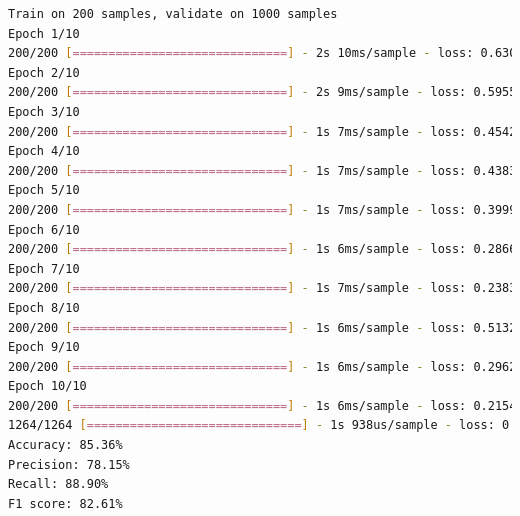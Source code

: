 \begin{lstlisting}[language=bash]
Train on 200 samples, validate on 1000 samples
Epoch 1/10
200/200 [==============================] - 2s 10ms/sample - loss: 0.6307 - acc: 0.6350 - f1_m: 0.3386 - precision_m: 0.9722 - recall_m: 0.2519 - val_loss: 0.6393 - val_acc: 0.6090 - val_f1_m: 0.6948 - val_precision_m: 0.5351 - val_recall_m: 0.9980
Epoch 2/10
200/200 [==============================] - 2s 9ms/sample - loss: 0.5955 - acc: 0.6250 - f1_m: 0.4697 - precision_m: 0.7757 - recall_m: 0.5645 - val_loss: 0.4988 - val_acc: 0.8390 - val_f1_m: 0.8320 - val_precision_m: 0.7773 - val_recall_m: 0.8969
Epoch 3/10
200/200 [==============================] - 1s 7ms/sample - loss: 0.4542 - acc: 0.8700 - f1_m: 0.8178 - precision_m: 0.8778 - recall_m: 0.7895 - val_loss: 0.4353 - val_acc: 0.8150 - val_f1_m: 0.8213 - val_precision_m: 0.7220 - val_recall_m: 0.9551
Epoch 4/10
200/200 [==============================] - 1s 7ms/sample - loss: 0.4383 - acc: 0.8000 - f1_m: 0.7469 - precision_m: 0.8571 - recall_m: 0.7411 - val_loss: 0.4922 - val_acc: 0.7600 - val_f1_m: 0.7883 - val_precision_m: 0.6582 - val_recall_m: 0.9867
Epoch 5/10
200/200 [==============================] - 1s 7ms/sample - loss: 0.3999 - acc: 0.8250 - f1_m: 0.8295 - precision_m: 0.8415 - recall_m: 0.8676 - val_loss: 0.3702 - val_acc: 0.8500 - val_f1_m: 0.8494 - val_precision_m: 0.7830 - val_recall_m: 0.9289
Epoch 6/10
200/200 [==============================] - 1s 6ms/sample - loss: 0.2866 - acc: 0.9050 - f1_m: 0.8928 - precision_m: 0.8759 - recall_m: 0.9155 - val_loss: 0.3480 - val_acc: 0.8490 - val_f1_m: 0.8474 - val_precision_m: 0.7793 - val_recall_m: 0.9292
Epoch 7/10
200/200 [==============================] - 1s 7ms/sample - loss: 0.2383 - acc: 0.9050 - f1_m: 0.9028 - precision_m: 0.8486 - recall_m: 0.9646 - val_loss: 0.4870 - val_acc: 0.7960 - val_f1_m: 0.7277 - val_precision_m: 0.9137 - val_recall_m: 0.6066
Epoch 8/10
200/200 [==============================] - 1s 6ms/sample - loss: 0.5132 - acc: 0.7800 - f1_m: 0.7525 - precision_m: 0.7843 - recall_m: 0.8197 - val_loss: 0.4105 - val_acc: 0.8100 - val_f1_m: 0.7571 - val_precision_m: 0.8881 - val_recall_m: 0.6615
Epoch 9/10
200/200 [==============================] - 1s 6ms/sample - loss: 0.2962 - acc: 0.8850 - f1_m: 0.8746 - precision_m: 0.9322 - recall_m: 0.8448 - val_loss: 0.3297 - val_acc: 0.8650 - val_f1_m: 0.8500 - val_precision_m: 0.8417 - val_recall_m: 0.8593
Epoch 10/10
200/200 [==============================] - 1s 6ms/sample - loss: 0.2154 - acc: 0.9500 - f1_m: 0.9505 - precision_m: 0.9344 - recall_m: 0.9677 - val_loss: 0.3243 - val_acc: 0.8710 - val_f1_m: 0.8628 - val_precision_m: 0.8376 - val_recall_m: 0.8928
1264/1264 [==============================] - 1s 938us/sample - loss: 0.3474 - acc: 0.8536 - f1_m: 0.8261 - precision_m: 0.7815 - recall_m: 0.8890
Accuracy: 85.36%
Precision: 78.15%
Recall: 88.90%
F1 score: 82.61%
\end{lstlisting}

